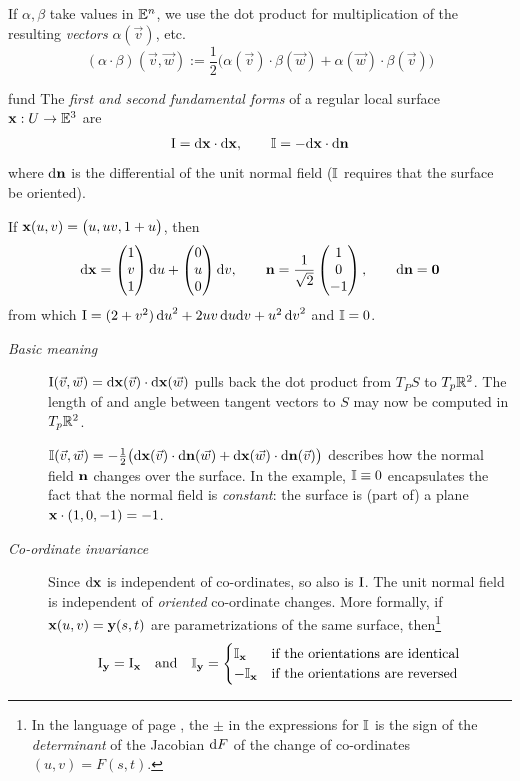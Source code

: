 
If $\alpha,\beta$ take values in $\mathbb{E}^n$, we use the dot product for multiplication of the resulting \emph{vectors} $\alpha(\vec v)$, etc.
\[(\alpha\cdot\beta)(\vec v,\vec w):=\frac 12\bigl(\alpha(\vec v)\cdot\beta(\vec w)+\alpha(\vec w)\cdot\beta(\vec v)\bigr)\]

\begin{defn}{}{fund}
The \emph{first and second fundamental forms} of a regular local surface ${\mathbf{x}}:U\to\mathbb{E}^3$ are
\[\mathrm{I}=\mathrm{d}{\mathbf{x}}\cdot\mathrm{d}{\mathbf{x}},\qquad \mathbb{I}=-\mathrm{d}{\mathbf{x}}\cdot\mathrm{d}{\mathbf{n}}\]
where $\mathrm{d}{\mathbf{n}}$ is the differential of the unit normal field ($\mathbb{I}$ requires that the surface be oriented).
\end{defn}


\begin{example}{}{}
\exstart If ${\mathbf{x}}(u,v)=\bigl(u,uv,1+u\bigr)$, then 
\[\mathrm{d}{\mathbf{x}}=\begin{pmatrix}1\\v\\1\end{pmatrix}{\mathrm{d}u}+\begin{pmatrix}0\\u\\0\end{pmatrix}{\mathrm{d}v},\qquad {\mathbf{n}}=\frac 1{\sqrt 2}\begin{pmatrix}1\\0\\-1\end{pmatrix},\qquad \mathrm{d}{\mathbf{n}}=\mathbf{0}\]
from which $\mathrm{I}=(2+v^2)\,{\mathrm{d} u}^2+2uv\,{\mathrm{d} u}{\mathrm{d} v}+u^2\,{\mathrm{d} v}^2$ and $\mathbb{I}=0$.
\end{example}

\goodbreak



\begin{description}
	\item[\normalfont\emph{Basic meaning}]\label{sec:formsmeaning} $\mathrm{I}(\vec v,\vec w)=\mathrm{d}{\mathbf{x}}(\vec v)\cdot\mathrm{d}{\mathbf{x}}(\vec w)$ pulls back the dot product from $T_PS$ to $T_p\mathbb{R}^2$. The length of and angle between tangent vectors to $S$ may now be computed in $T_p\mathbb{R}^2$.\par
	 	$\mathbb{I}(\vec v,\vec w)=-\frac 12\bigl(\mathrm{d}{\mathbf{x}}(\vec v)\cdot\mathrm{d}{\mathbf{n}}(\vec w)+\mathrm{d}{\mathbf{x}}(\vec w)\cdot\mathrm{d}{\mathbf{n}}(\vec v)\bigr)$ describes how the normal field ${\mathbf{n}}$ changes over the surface. In the example, $\mathbb{I}\equiv 0$ encapsulates the fact that the normal field is \emph{constant}: the surface is (part of) a plane ${\mathbf{x}}\cdot(1,0,-1)=-1$.
	
	\item[\normalfont\emph{Co-ordinate invariance}] Since $\mathrm{d}{\mathbf{x}}$ is independent of co-ordinates, so also is $\mathrm{I}$. The unit normal field is independent of \emph{oriented} co-ordinate changes. More formally, if ${\mathbf{x}}(u,v)={\mathbf{y}}(s,t)$ are parametrizations of the same surface, then\footnote{In the language of page \pageref{aside:coc}, the $\pm$ in the expressions for $\mathbb{I}$ is the sign of the \emph{determinant} of the Jacobian $\mathrm{d} F$ of the change of co-ordinates $(u,v)=F(s,t)$.}
	\[\mathrm{I}_{\mathbf{y}}=\mathrm{I}_{\mathbf{x}}\quad \text{and}\quad \mathbb{I}_{\mathbf{y}}=\begin{cases}
	\mathbb{I}_{\mathbf{x}}&\text{if the orientations are identical}\\
	-\mathbb{I}_{\mathbf{x}}&\text{if the orientations are reversed}
	\end{cases}\]
\end{description}


